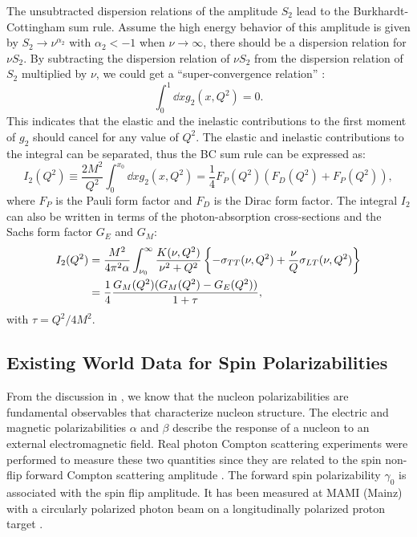 The unsubtracted dispersion relations of the amplitude $S_2$ lead to the Burkhardt-Cottingham sum rule. Assume the high energy behavior of this amplitude is given by $S_2\rightarrow\nu^{\alpha_2}$ with $\alpha_2<-1$ when $\nu\rightarrow\infty$, there should be a dispersion relation for $\nu S_2$. By subtracting the dispersion relation of $\nu S_2$ from the dispersion relation of $S_2$ multiplied by $\nu$, we could get a ``super-convergence relation'' \cite{Burkhardt1970}:
\begin{equation} \label{C4S2E20}
\int_0^1\dd{x}g_2(x,Q^2) = 0.
\end{equation}
This indicates that the elastic and the inelastic contributions to the first moment of $g_2$ should cancel for any value of $Q^2$. The elastic and inelastic contributions to the integral can be separated, thus the BC sum rule can be expressed as:
\begin{equation} \label{C4S2E21}
I_2(Q^2) \equiv \frac{2M^2}{Q^2}\int_0^{x_0}\dd{x}g_2(x,Q^2) = \frac{1}{4}F_P(Q^2)(F_D(Q^2)+F_P(Q^2)),
\end{equation}
where $F_P$ is the Pauli form factor and $F_D$ is the Dirac form factor. The integral $I_2$ can also be written in terms of the photon-absorption cross-sections and the Sachs form factor $G_E$ and $G_M$:
\begin{equation} \label{C4S2E22}
\begin{split}
I_2(Q^2) & = \frac{M^2}{4\pi^2\alpha}\int_{\nu_0}^\infty\frac{K(\nu,Q^2)}{\nu^2+Q^2}\left\{-\sigma_{TT}(\nu,Q^2)+\frac{\nu}{Q}\sigma_{LT}(\nu,Q^2)\right\} \\
& = \frac{1}{4}\frac{G_M(Q^2)(G_M(Q^2)-G_E(Q^2))}{1+\tau},
\end{split}
\end{equation}
with $\tau=Q^2/4M^2$.

\subsection{Existing World Data for Spin Polarizabilities}
\label{C4S2SS2}

From the discussion in , we know that the nucleon polarizabilities are fundamental observables that characterize nucleon structure. The electric and magnetic polarizabilities $\alpha$ and $\beta$ describe the response of a nucleon to an external electromagnetic field. Real photon Compton scattering experiments were performed to measure these two quantities since they are related to the spin non-flip forward Compton scattering amplitude \cite{Olmos2001,Tonnison1998}. The forward spin polarizability $\gamma_0$ is associated with the spin flip amplitude. It has been measured at MAMI (Mainz) with a circularly polarized photon beam on a longitudinally polarized proton target \cite{Ahrens2001}.

